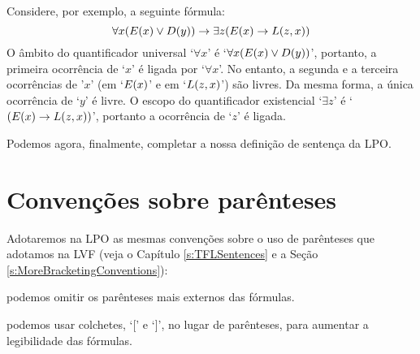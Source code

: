 
        
Considere, por exemplo, a seguinte fórmula:
	$$\forall x(\mathord{E}(x) \vee \mathord{D}(y)) \rightarrow \exists z(\mathord{E}(x) \rightarrow \mathord{L}(z,x))$$
O âmbito do quantificador universal `$\forall x$' é `$\forall x (\mathord{E}(x) \vee \mathord{D}(y))$', portanto, a primeira ocorrência de `$x$' é ligada por `$\forall x$'.
No entanto, a segunda e a terceira ocorrências de '$x$' (em `$\mathord{E}(x)$' e em `$\mathord{L}(z,x)$') são livres.
Da mesma forma, a única ocorrência de `$y$' é livre.
O escopo do quantificador existencial `$\exists z$' é `$(\mathord{E}(x) \rightarrow \mathord{L}(z,x))$', portanto a ocorrência de `$z$' é ligada.

Podemos agora, finalmente, completar a nossa definição de sentença da LPO.



\section{Convenções sobre parênteses}

Adotaremos na LPO as mesmas convenções sobre o uso de parênteses que adotamos na LVF (veja o Capítulo \ref{s:TFLSentences} e a Seção \ref{s:MoreBracketingConventions}):
\begin{ebullet}
	\item podemos omitir os parênteses mais externos das fórmulas.
	\item podemos usar colchetes, `[' e `]', no lugar de parênteses, para aumentar a legibilidade das fórmulas.
\end{ebullet}



